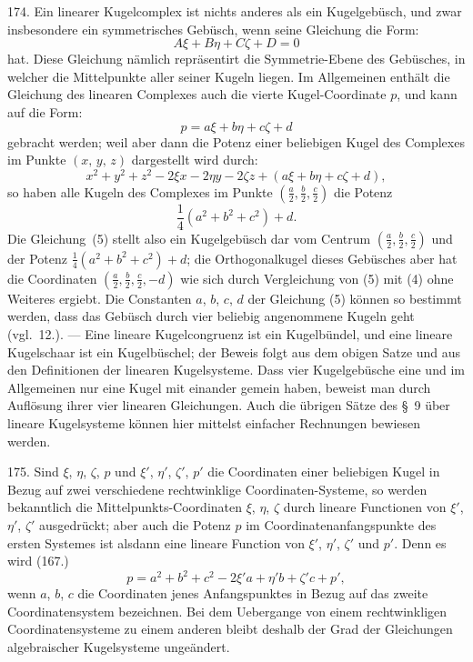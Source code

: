 174. Ein linearer Kugelcomplex ist nichts anderes als
ein Kugelgeb\"usch, und zwar insbesondere ein symmetrisches
Geb\"usch, wenn seine Gleichung die Form:
\[
  A\xi + B\eta + C\zeta + D = 0
\]
hat. Diese Gleichung n\"amlich repr\"asentirt die Symmetrie-Ebene
des Ge\-b\"u\-sches, in welcher die Mittelpunkte aller
seiner Kugeln liegen. Im Allgemeinen enth\"alt die Gleichung
des linearen Complexes auch die vierte Kugel-Coordinate $p$,
und kann auf die Form:
\[
\tag{5}
  p = a\xi + b\eta + c\zeta + d
\]
gebracht werden; weil aber dann die Potenz einer beliebigen
Kugel des Complexes im Punkte $(x,\, y,\, z)$ dargestellt wird durch:
\[
  x^2 + y^2 + z^2 - 2\xi x - 2\eta y - 2\zeta z
+ ( a\xi + b\eta + c\zeta + d ),
\]
so haben alle Kugeln des Complexes im Punkte
$\left( \frac{a}{2}, \frac{b}{2}, \frac{c}{2} \right)$
die Potenz
\[
  \textstyle\frac{1}{4} (a^2 + b^2 + c^2) + d.
\]
Die Gleichung~(5) stellt also ein Kugelgeb\"usch dar vom
Centrum
$\left( \frac{a}{2}, \frac{b}{2}, \frac{c}{2} \right)$
und der Potenz
$\frac{1}{4} (a^2 + b^2 + c^2) + d$; die
Orthogonalkugel dieses Geb\"usches aber hat die Coordinaten
$\left( \frac{a}{2}, \frac{b}{2}, \frac{c}{2}, -d \right)$
wie sich durch Vergleichung von (5) mit (4)
ohne Weiteres ergiebt. Die Constanten $a$, $b$, $c$, $d$ der Gleichung
(5) k\"onnen so bestimmt werden, dass das Geb\"usch durch vier
beliebig angenommene Kugeln geht (vgl.~12.). --- Eine lineare
Kugelcongruenz ist ein Kugelb\"undel, und eine lineare Kugelschaar
ist ein Kugelb\"uschel; der Beweis folgt aus dem obigen
Satze und aus den Definitionen der linearen Kugelsysteme.
Dass vier Kugelgeb\"usche eine und im Allgemeinen nur eine
Kugel mit einander gemein haben, beweist man durch Auf\/l\"osung
ihrer vier linearen Gleichungen. Auch die \"ubrigen
S\"atze des \S~9 \"uber lineare Kugelsysteme k\"onnen hier mittelst
einfacher Rechnungen bewiesen werden.

175. Sind $\xi$, $\eta$, $\zeta$, $p$ und $\xi'$, $\eta'$, $\zeta'$, $p'$ die Coordinaten
einer beliebigen Kugel in Bezug auf zwei verschiedene rechtwinklige
Coordinaten-Systeme, so werden bekanntlich die
Mittelpunkts-Coordinaten $\xi$, $\eta$, $\zeta$ durch lineare Functionen
von $\xi'$, $\eta'$, $\zeta'$ ausgedr\"uckt; aber auch die Potenz $p$ im Coordinatenanfangspunkte
des ersten Systemes ist alsdann eine
lineare Function von $\xi'$, $\eta'$, $\zeta'$ und $p'$. Denn es wird (167.)
\[
  p = a^2 + b^2 + c^2 - 2\xi'a + \eta'b + \zeta'c + p',
\]
wenn $a$, $b$, $c$ die Coordinaten jenes Anfangspunktes in Bezug
auf das zweite Coordinatensystem bezeichnen. Bei dem
Uebergange von einem rechtwinkligen Coordinatensysteme
zu einem anderen bleibt deshalb der Grad der Gleichungen
algebraischer Kugelsysteme unge\"andert.

